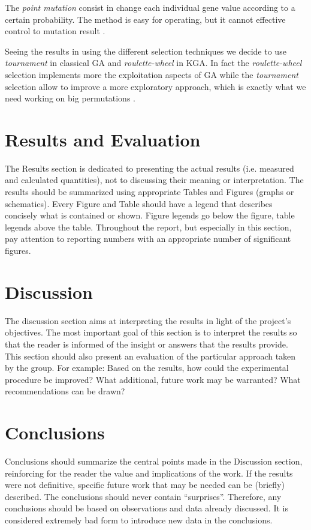 \documentclass[10pt]{article}
\begin{document}
The \textit{point mutation} consist in change each individual gene value according to a certain probability. The method is easy for operating, but it cannot effective control to mutation
result \cite{ventisei}.

Seeing the results in using the different selection techniques we decide to use \textit{tournament} in classical GA and \textit{roulette-wheel} in KGA. In fact the \textit{roulette-wheel} selection implements more the exploitation aspects of GA while the \textit{tournament} selection allow to improve a more exploratory approach, which is exactly what we need working on big permutations \cite{ventisette}.

\section{Results and Evaluation}
The Results section is dedicated to presenting the actual results (i.e. measured and calculated quantities), not to discussing their meaning or interpretation. The results should be summarized using appropriate Tables and Figures (graphs or schematics). Every Figure and Table should have a legend that describes concisely what is contained or shown. Figure legends go below the figure, table legends above the table. Throughout the report, but especially in this section, pay attention to reporting numbers with an appropriate number of significant figures. 

\section{Discussion}
The discussion section aims at interpreting the results in light of the project's objectives. The most important goal of this section is to interpret the results so that the reader is informed of the insight or answers that the results provide. This section should also present an evaluation of the particular approach taken by the group. For example: Based on the results, how could the experimental procedure be improved? What additional, future work may be warranted? What recommendations can be drawn?


\section{Conclusions}
Conclusions should summarize the central points made in the Discussion section, reinforcing for the reader the value and implications of the work. If the results were not definitive, specific future work that may be needed can be (briefly) described. The conclusions should never contain ``surprises''. Therefore, any conclusions should be based on observations and data already discussed. It is considered extremely bad form to introduce new data in the conclusions.
\end{document}
